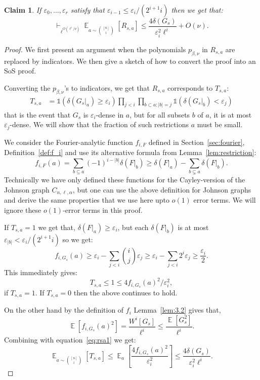 \documentclass[11pt]{article}
\DeclareMathOperator*{\E}{\mathbb{E}}
\def \eps {{\varepsilon}}
\def \one {\mathbb{1}}
\newtheorem{claim}[theorem]{Claim}
\theoremstyle{definition}
\begin{document}
\begin{claim}\label{claim:dense-subcubes}
If $\eps_0, \ldots, \eps_r$ satisfy that $\eps_{i-1} \leq \eps_i/(2^{i+1} i)$ then we get that:
\[\vdash_{\ell^{O(\ell^i/\nu)}} \E_{a \sim {[n] \choose i}}[R_{s,a}] \leq \frac{4\delta(G_s)}{\eps_i^2\ell^i} + O(\nu).\]
\end{claim}
\begin{proof}
We first present an argument when the polynomials $p_{\beta,\nu}$ in $R_{s,a}$ are replaced by indicators. We then give a sketch of how to convert the proof into an SoS proof. 

Converting the $p_{\beta,\nu}$'s to indicators, we get that $R_{s,a}$ corresponds to $T_{s,a}$: 
\begin{align*}
    T_{s,a} 
    &= \one(\delta(G_s|_a) \geq \eps_i) \prod_{j < i}\prod_{b \subset a: |b| 
    = j}\one(\delta(G_s|_b) < \eps_j)
\end{align*}
that is the event that $G_s$ is $\eps_i$-dense in $a$, but for all subsets $b$ of $a$, it is at most $\eps_j$-dense. We will show that the fraction of such restrictions $a$ must be small.

We consider the Fourier-analytic function $f_{i,F}$ defined in Section~\ref{sec:fourier}, Definition~\ref{def:f_i} and use its alternative formula from Lemma~\ref{lem:restriction}:
\[f_{i,F}(a) = \sum_{b \subseteq a} (-1)^{i -|b|}\delta(F|_b) \geq \delta(F|_a) - \sum_{b \subsetneq a} \delta(F|_b).\]
Technically we have only defined these functions for the Cayley-version of the Johnson graph $C_{n,\ell,\alpha}$, but one can use the above definition for Johnson graphs and derive the same properties that we use here upto $o(1)$ error terms. We will ignore these $o(1)$-error terms in this proof.

If $T_{s,a} = 1$ we get that, $\delta(F|_a) \geq \eps_i$, but each $\delta(F|_b)$ is at most $\eps_{|b|} < \eps_i/(2^{i+1} i)$ so we get:
\[f_{i,G_s}(a) \geq \eps_i - \sum_{j < i} {i \choose j}\eps_j \geq \eps_i - \sum_{j < i} 2^i \eps_j \geq \frac{\eps_i}{2}.\]
This immediately gives: 
\begin{equation}\label{eq:rsa1}
T_{s,a} \leq 1 \leq 4f_{i,G_s}(a)^2/\eps_i^2,
\end{equation}
if $T_{s,a} = 1$. If $T_{s,a} = 0$ then the above continues to hold.

On the other hand by the definition of $f_{i}$ Lemma~\ref{lem:3.2} gives that, 
\[\E[f_{i,G_s}(a)^2] = \frac{W^i[G_s]}{\ell^i} \leq \frac{\E[G_s^2]}{\ell^i}.\]
Combining with equation~\ref{eq:rsa1} we get:
\[\E_{a \sim {[n] \choose i}}[T_{s,a}] \leq \E_{a}\left[\frac{4f_{i,G_s}(a)^2}{\eps_i^2}\right] \leq \frac{4\delta(G_s)}{\eps_i^2\ell^i}.\]


\end{proof}
\end{document}
